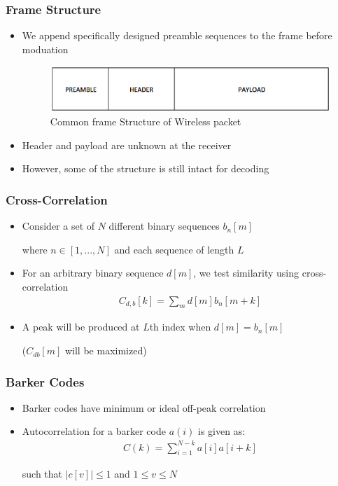 \documentclass[10pt]{beamer}
\begin{document}
\frame
{
  \frametitle{Frame Structure}

    \begin{itemize}
        \item We append specifically designed preamble sequences to the frame before moduation
        \begin{figure}
  				\includegraphics[width=\linewidth]{./frame.eps}
 				 \caption{Common frame Structure of Wireless packet}
  				\label{fig:preamble followed by header and payload data}
		\end{figure}
        \item Header and payload are unknown at the receiver 
        \item However, some of the structure is still intact for decoding
    \end{itemize}

}

\frame
{
  \frametitle{Cross-Correlation}

    \begin{itemize}
        \item Consider a set of $N$ different binary sequences $b_n[m]$
        
         where $n \in [1,...,N]$ and each sequence of length $L$
         
         \item For an arbitrary binary sequence $d[m]$, we test similarity using cross-correlation 
        \begin{equation}
        \begin{split}
            C_{d,b}[k] = \sum_{m} d[m]b_n[m+k]
        \end{split}
        \end{equation}
        \item A peak will be produced at $L$th index when $d[m]=b_n[m]$
        
         ($C_{db}[m]$ will be maximized)
    \end{itemize}

}

\frame
{
  \frametitle{Barker Codes}

    \begin{itemize}
        \item Barker codes have minimum or ideal off-peak correlation
        \item Autocorrelation for a barker code $a(i)$ is given as:
        \begin{equation}
        \begin{split}
            C(k) = \sum_{i=1}^{N-k} a[i]a[i+k]
        \end{split}
        \end{equation}
        
         such that $|c[v]|\leq 1$ and $1\leq v \leq N$
    \end{itemize}

}
\end{document}
